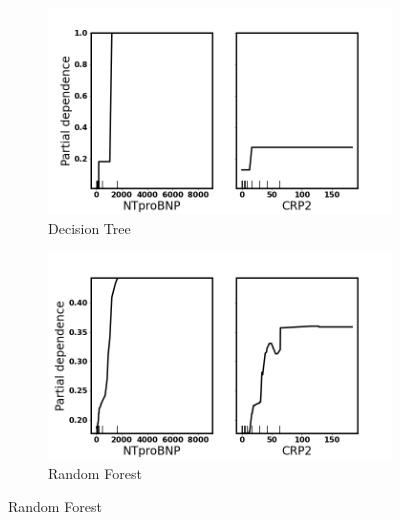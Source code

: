 \begin{figure}[H]
\centering
\begin{subfigure}[b]{0.85\textwidth}
    \centering
    \includegraphics[width=\textwidth]{figures/chapter_interp/dt_pdp_crp_ntproBNP.png}
    \caption{Decision Tree}
    \label{fig:dt_pdp}
\end{subfigure}
\begin{subfigure}[b]{0.85\textwidth}
    \centering
    \includegraphics[width=\textwidth]{figures/chapter_interp/rf_pdp_crp_ntproBNP.png}
    \caption{Random Forest}
    \label{fig:rf_pdp}
\end{subfigure}
\end{figure}
